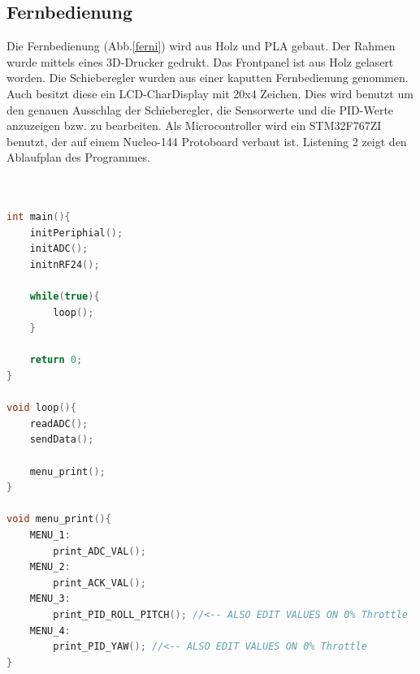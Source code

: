 \documentclass[12pt,a4paper, ngerman]{article}
\begin{document}
\subsection{Fernbedienung}
Die Fernbedienung (Abb.\ref{ferni}) wird aus Holz und PLA gebaut. Der Rahmen wurde mittels eines 3D-Drucker gedrukt. Das Frontpanel ist aus Holz gelasert worden. Die Schieberegler wurden aus einer kaputten Fernbedienung genommen. Auch besitzt diese ein LCD-CharDisplay mit 20x4 Zeichen. Dies wird benutzt um den genauen Ausschlag der Schieberegler, die Sensorwerte und die PID-Werte anzuzeigen bzw. zu bearbeiten. Als Microcontroller wird ein STM32F767ZI benutzt, der auf einem Nucleo-144 Protoboard verbaut ist. Listening 2 zeigt den Ablaufplan des Programmes.\\ \\ \\
\begin{lstlisting}[language=C++,caption=Programmablauf Pseudocode]
int main(){
	initPeriphial();
	initADC();
	initnRF24();

	while(true){
		loop();
	}
	
	return 0;
}

void loop(){
	readADC();
	sendData();
	
	menu_print();
}

void menu_print(){
	MENU_1:
		print_ADC_VAL();
	MENU_2:
		print_ACK_VAL();
	MENU_3:
		print_PID_ROLL_PITCH(); //<-- ALSO EDIT VALUES ON 0% Throttle
	MENU_4:
		print_PID_YAW(); //<-- ALSO EDIT VALUES ON 0% Throttle
}


\end{lstlisting}
\newpage
\end{document}
